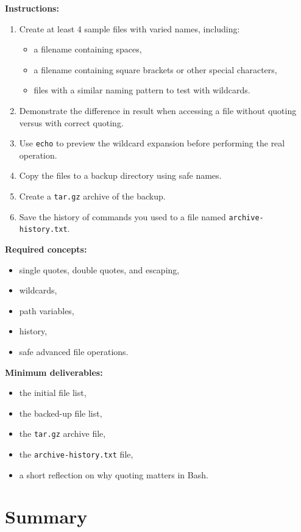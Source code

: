 \textbf{Instructions:}
\begin{enumerate}
  \item Create at least 4 sample files with varied names, including:
  \begin{itemize}
    \item a filename containing spaces,
    \item a filename containing square brackets or other special characters,
    \item files with a similar naming pattern to test with wildcards.
  \end{itemize}
  \item Demonstrate the difference in result when accessing a file without
    quoting versus with correct quoting.
  \item Use \texttt{echo} to preview the wildcard expansion before performing
    the real operation.
  \item Copy the files to a backup directory using safe names.
  \item Create a \texttt{tar.gz} archive of the backup.
  \item Save the history of commands you used to a file named
    \texttt{archive-history.txt}.
\end{enumerate}

\textbf{Required concepts:}
\begin{itemize}
  \item single quotes, double quotes, and escaping,
  \item wildcards,
  \item path variables,
  \item history,
  \item safe advanced file operations.
\end{itemize}

\textbf{Minimum deliverables:}
\begin{itemize}
  \item the initial file list,
  \item the backed-up file list,
  \item the \texttt{tar.gz} archive file,
  \item the \texttt{archive-history.txt} file,
  \item a short reflection on why quoting matters in Bash.
\end{itemize}

\section{Summary}
\label{sec:bash-summary}

